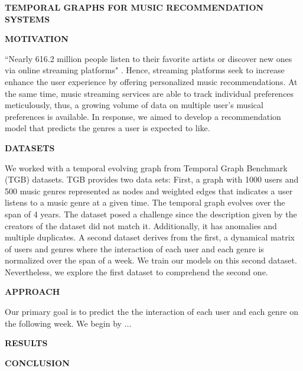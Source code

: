 \documentclass[10pt, letterpaper]{article}
\renewcommand{\title}[1]{%
	\begin{center}
		{\Large \bfseries \uppercase{#1}}
	\end{center}
}
\renewcommand{\section}[1]{%
	    \vspace{\parskip}
		{\large \bfseries\uppercase{#1}}
}
\begin{document}
	
\title{Temporal Graphs for Music Recommendation Systems}

\section{Motivation}

``Nearly 616.2 million people listen to their favorite artists or discover new ones via online streaming platforms" \cite{statista}. Hence, streaming platforms seek to increase enhance the user experience by offering personalized music recommendations. At the same time, music streaming services are able to track individual preferences meticulously, thus, a growing volume of data on  multiple user's musical preferences is available.
In response, we aimed to develop a recommendation model that predicts the genres a user is expected to like.

\section{Datasets}

We worked with a temporal evolving graph from Temporal Graph Benchmark (TGB) \cite{H:2023} datasets. TGB provides two data sets: First, a graph with 1000 users and 500 music genres represented as nodes and weighted edges that indicates a user listens to a music genre at a given time. The temporal graph evolves over the span of 4 years. The dataset posed a challenge since the description given by the creators of the dataset did not match it. Additionally, it has anomalies and multiple duplicates. A second dataset derives from the first, a dynamical matrix of users and genres where the interaction of each user and each genre is normalized over the span of a week. We train our models on this second dataset. Nevertheless, we explore the first dataset to comprehend the second one.

\section{Approach}

Our primary goal is to predict the the interaction of each user and each genre on the following week. We begin by ...

\section{Results}

\section{Conclusion}
\end{document}
